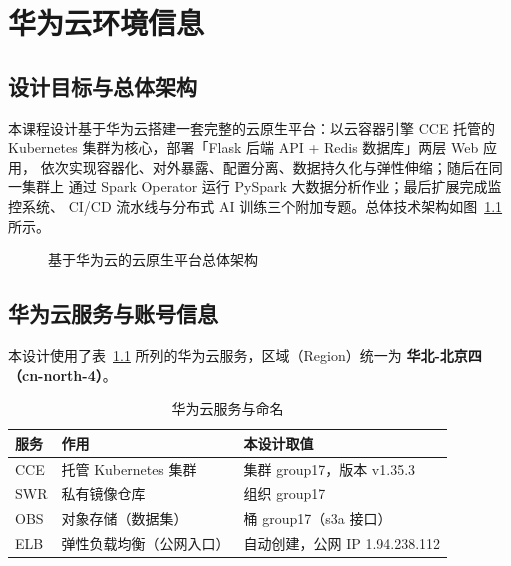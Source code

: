 \chapter{华为云环境信息}

\section{设计目标与总体架构}

本课程设计基于华为云搭建一套完整的云原生平台：以云容器引擎 CCE 托管的
Kubernetes 集群为核心，部署「Flask 后端 API + Redis 数据库」两层 Web 应用，
依次实现容器化、对外暴露、配置分离、数据持久化与弹性伸缩；随后在同一集群上
通过 Spark Operator 运行 PySpark 大数据分析作业；最后扩展完成监控系统、
CI/CD 流水线与分布式 AI 训练三个附加专题。总体技术架构如图~\ref{fig:arch} 所示。

\begin{figure}[htbp]\centering
\begin{minipage}[c][5.2cm][c]{0.9\textwidth}\centering\ttfamily\small
{}
\end{minipage}
\caption{基于华为云的云原生平台总体架构}\label{fig:arch}
\end{figure}

\section{华为云服务与账号信息}

本设计使用了表~\ref{tab:hwservices} 所列的华为云服务，区域（Region）统一为
\textbf{华北-北京四（cn-north-4）}。

\begin{table}[htbp]\centering
\caption{华为云服务与命名}\label{tab:hwservices}
\begin{tabular}{lll}
\toprule
服务 & 作用 & 本设计取值 \\
\midrule
CCE  & 托管 Kubernetes 集群 & 集群 group17，版本 v1.35.3 \\
SWR  & 私有镜像仓库 & 组织 group17 \\
OBS  & 对象存储（数据集） & 桶 group17（s3a 接口） \\
ELB  & 弹性负载均衡（公网入口） & 自动创建，公网 IP 1.94.238.112 \\
\bottomrule
\end{tabular}
\end{table}

